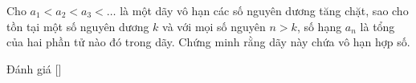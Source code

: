 \ifshowproblem
\begin{problem}\label{problem:BGR-2015-EGMO-TST-P1}
	Cho $a_1 < a_2 < a_3 < \ldots$ là một dãy vô hạn các số nguyên dương tăng chặt,
	sao cho tồn tại một số nguyên dương $k$ và với mọi số nguyên $n > k$, số hạng $a_n$ là tổng của hai phần tử nào đó trong dãy.
	Chứng minh rằng dãy này chứa vô hạn hợp số.
\end{problem}
\fi

\ifshowinfo
Đánh giá [\textbf{}]\footnotemark
{}
\fi